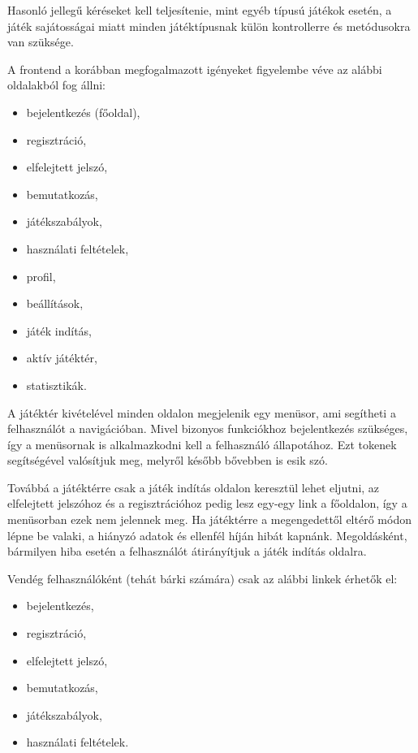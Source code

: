 Hasonló jellegű kéréseket kell teljesítenie, mint egyéb típusú játékok esetén, a játék sajátosságai miatt minden játéktípusnak külön kontrollerre és metódusokra van szüksége.




A frontend a korábban megfogalmazott igényeket figyelembe véve az alábbi oldalakból fog állni:
\begin{itemize}
	\item bejelentkezés (főoldal),
	\item regisztráció,
	\item elfelejtett jelszó,
	\item bemutatkozás,
	\item játékszabályok,
	\item használati feltételek,
	\item profil,
	\item beállítások,
	\item játék indítás,
	\item aktív játéktér,
	\item statisztikák.
\end{itemize}
A játéktér kivételével minden oldalon megjelenik egy menüsor, ami segítheti a felhasználót a navigációban. Mivel bizonyos funkciókhoz bejelentkezés szükséges, így a menüsornak is alkalmazkodni kell a felhasználó állapotához. Ezt tokenek segítségével valósítjuk meg, melyről később bővebben is esik szó.

Továbbá a játéktérre csak a játék indítás oldalon keresztül lehet eljutni, az elfelejtett jelszóhoz és a regisztrációhoz pedig lesz egy-egy link a főoldalon, így a menüsorban ezek nem jelennek meg. Ha játéktérre a megengedettől eltérő módon lépne be valaki, a hiányzó adatok és ellenfél híján hibát kapnánk. Megoldásként, bármilyen hiba esetén a felhasználót átirányítjuk a játék indítás oldalra.

Vendég felhasználóként (tehát bárki számára) csak az alábbi linkek érhetők el:
\begin{itemize}
	\item bejelentkezés,
	\item regisztráció,
	\item elfelejtett jelszó,
	\item bemutatkozás,
	\item játékszabályok,
	\item használati feltételek.
\end{itemize}

